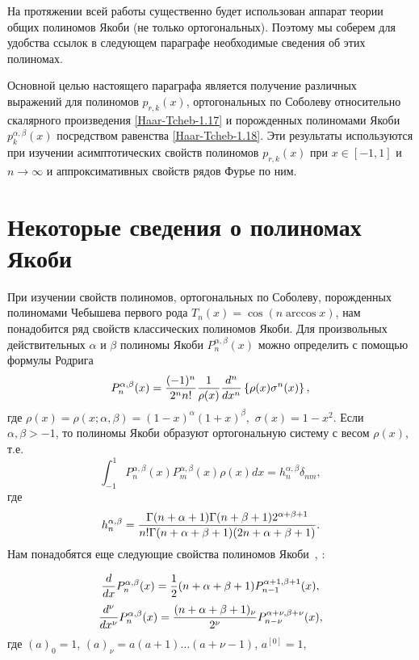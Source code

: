 На протяжении всей работы существенно будет использован аппарат теории общих полиномов Якоби (не только ортогональных). Поэтому мы соберем для удобства ссылок в следующем параграфе необходимые сведения об этих полиномах.

Основной целью настоящего параграфа является получение различных выражений для полиномов $p_{r,k}(x)$, ортогональных по Соболеву относительно скалярного произведения \eqref{Haar-Tcheb-1.17} и порожденных полиномами Якоби $p^{\alpha,\beta}_{k}(x)$ посредством  равенства \eqref{Haar-Tcheb-1.18}. Эти результаты используются  при изучении асимптотических свойств полиномов $p_{r,k}(x)$ при $x\in[-1,1]$ и $n\to\infty$ и аппроксимативных свойств рядов Фурье по ним.

\section{Некоторые сведения о полиномах Якоби}
При изучении свойств полиномов, ортогональных по Соболеву, порожденных полиномами Чебышева первого рода $T_n(x)=\cos(n\arccos x)$, нам понадобится ряд свойств классических полиномов Якоби.  Для произвольных действительных $\alpha$ и $\beta$ полиномы Якоби  $P_n^{\alpha,\beta}(x)$ можно определить \cite{Haar-Tcheb-Sege}  с помощью формулы Родрига
 \begin{equation}\label{Haar-Tcheb-eq5.1}
P_n^{\alpha,\beta}(x) = {(-1)^n\over2^nn!}{1\over\rho(x)}{d^n\over
dx^n} \left\{\rho(x)\sigma^n(x)\right\},
\end{equation}
где  $\rho(x)=\rho(x;\alpha,\beta) =
(1-x)^\alpha(1+x)^\beta,\,\,\sigma(x)=1-x^2$. Если
$\alpha,\beta>-1$, то полиномы Якоби образуют ортогональную
систему с весом $\rho(x)$, т.е.
\begin{equation}\label{Haar-Tcheb-eq5.2}
\int_{-1}^1P_n^{\alpha,\beta}(x)P_m^{\alpha,\beta}(x)\rho(x)dx =
h_n^{\alpha,\beta}\delta_{nm},
\end{equation}
где
\begin{equation}\label{Haar-Tcheb-eq5.3}
h_n^{\alpha,\beta} =
{\Gamma(n+\alpha+1)\Gamma(n+\beta+1)2^{\alpha+\beta+1} \over
n!\Gamma(n+\alpha+\beta+1)(2n+\alpha+\beta+1)}.
\end{equation}
Нам понадобятся еще следующие свойства полиномов Якоби~\cite{Haar-Tcheb-Sege}, \cite{Haar-Tcheb-Gasper}:


\begin{equation}\label{Haar-Tcheb-eq5.4}
{d\over dx}P_n^{\alpha,\beta}(x) =
{1\over2}(n+\alpha+\beta+1)P_{n-1}^{\alpha+1,\beta+1}(x),
\end{equation}
\begin{equation}\label{Haar-Tcheb-eq5.5}
{d^\nu\over dx^\nu}P_n^{\alpha,\beta}(x) =
{(n+\alpha+\beta+1)_\nu\over2^\nu} P_{n-\nu}^{\alpha+\nu,\beta+\nu}(x),
\end{equation}
где $(a)_0=1$, $(a)_\nu=a(a+1)\dots(a+\nu-1)$, $a^{[0]}=1$,

